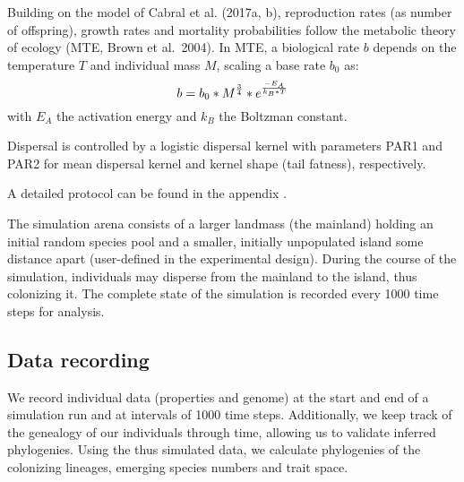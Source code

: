 \documentclass[a4paper]{scrartcl}
\begin{document}
Building on the model of Cabral et al. (2017a, b), reproduction rates (as number of offspring),
growth rates and mortality probabilities follow the metabolic theory
of ecology (MTE, Brown et al.\ 2004). %
In MTE, a biological rate $b$ depends on the temperature $T$ and individual mass $M$, scaling a base rate $b_0$ as:
\begin{equation}
  b=b_0*M^{3\over4}*e^{-{E_A}\over{k_B*T}}
  \label{eq:MTE}
\end{equation}
with $E_A$ the activation energy and $k_B$ the Boltzman constant.

Dispersal is controlled by a logistic dispersal kernel \cite{bullockjamesm.SynthesisEmpiricalPlant2016}
with parameters PAR1 and PAR2
for mean dispersal kernel and kernel shape (tail fatness), respectively.

A detailed protocol can be found in the appendix \cite{grimmStandardProtocolDescribing2006a} \cite{grimmODDProtocolReview2010}.



The simulation arena consists of a larger landmass (the mainland) holding an initial random species pool and a smaller,
initially unpopulated island some distance apart (user-defined in the experimental design).
During the course of the simulation, individuals may disperse from the mainland to the island, thus colonizing it. 
The complete state of the simulation is recorded every 1000 time steps for analysis.

\subsection{Data recording}
We record individual data (properties and genome) at the start and end of a simulation run
and at intervals of 1000 time steps.%
Additionally, we keep track of the genealogy of our individuals through time,
allowing us to validate inferred phylogenies.
Using the thus simulated data, we calculate phylogenies of the colonizing lineages, emerging species numbers and
trait space. %
\end{document}
